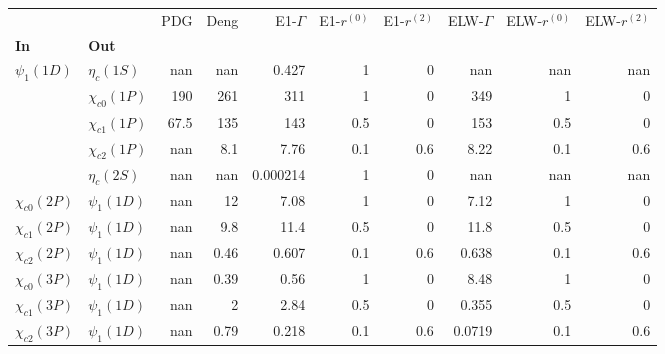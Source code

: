 \begin{tabular}{l|l|r|r|r|r|r|r|r|r}
\toprule
                &                &  PDG &  Deng &  E1-$\Gamma$ &  E1-$r^{(0)}$ &  E1-$r^{(2)}$ &  ELW-$\Gamma$ &  ELW-$r^{(0)}$ &  ELW-$r^{(2)}$ \\
\textbf{In} & \textbf{Out} &      &       &              &               &               &               &                &                \\
\midrule
\textbf{$\psi_{1}(1D)$} & \textbf{$\eta_{c}(1S)$} &  nan &   nan &        0.427 &             1 &             0 &           nan &            nan &            nan \\
                & \textbf{$\chi_{c0}(1P)$} &  190 &   261 &          311 &             1 &             0 &           349 &              1 &              0 \\
                & \textbf{$\chi_{c1}(1P)$} & 67.5 &   135 &          143 &           0.5 &             0 &           153 &            0.5 &              0 \\
                & \textbf{$\chi_{c2}(1P)$} &  nan &   8.1 &         7.76 &           0.1 &           0.6 &          8.22 &            0.1 &            0.6 \\
                & \textbf{$\eta_{c}(2S)$} &  nan &   nan &     0.000214 &             1 &             0 &           nan &            nan &            nan \\
\textbf{$\chi_{c0}(2P)$} & \textbf{$\psi_{1}(1D)$} &  nan &    12 &         7.08 &             1 &             0 &          7.12 &              1 &              0 \\
\textbf{$\chi_{c1}(2P)$} & \textbf{$\psi_{1}(1D)$} &  nan &   9.8 &         11.4 &           0.5 &             0 &          11.8 &            0.5 &              0 \\
\textbf{$\chi_{c2}(2P)$} & \textbf{$\psi_{1}(1D)$} &  nan &  0.46 &        0.607 &           0.1 &           0.6 &         0.638 &            0.1 &            0.6 \\
\textbf{$\chi_{c0}(3P)$} & \textbf{$\psi_{1}(1D)$} &  nan &  0.39 &         0.56 &             1 &             0 &          8.48 &              1 &              0 \\
\textbf{$\chi_{c1}(3P)$} & \textbf{$\psi_{1}(1D)$} &  nan &     2 &         2.84 &           0.5 &             0 &         0.355 &            0.5 &              0 \\
\textbf{$\chi_{c2}(3P)$} & \textbf{$\psi_{1}(1D)$} &  nan &  0.79 &        0.218 &           0.1 &           0.6 &        0.0719 &            0.1 &            0.6 \\
\bottomrule
\end{tabular}

